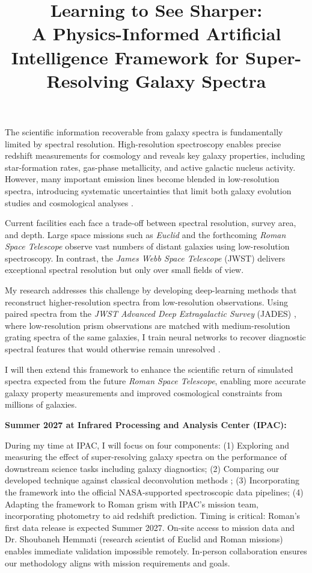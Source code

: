 \documentclass[12pt]{article}
\title{Learning to See Sharper:\\ A Physics-Informed Artificial Intelligence Framework for Super-Resolving Galaxy Spectra}
\date{}
\begin{document}
\maketitle
\vspace{-2.5cm}

The scientific information recoverable from galaxy spectra is fundamentally limited by spectral resolution. High-resolution spectroscopy enables precise redshift measurements for cosmology and reveals key galaxy properties, including star-formation rates, gas-phase metallicity, and active galactic nucleus activity. However, many important emission lines become blended in low-resolution spectra, introducing systematic uncertainties that limit both galaxy evolution studies and cosmological analyses \citep{Hemmati2019, DESI2025, Shivaei2020, Khostovan2024}.

Current facilities each face a trade-off between spectral resolution, survey area, and depth. Large space missions such as \textit{Euclid} \citep{euclid} and the forthcoming \textit{Roman Space Telescope} \citep{roman_1, roman_2} observe vast numbers of distant galaxies using low-resolution spectroscopy. In contrast, the \textit{James Webb Space Telescope} (JWST) \citep{jwst} delivers exceptional spectral resolution but only over small fields of view. 

My research addresses this challenge by developing deep-learning methods that reconstruct higher-resolution spectra from low-resolution observations. Using paired spectra from the \textit{JWST Advanced Deep Extragalactic Survey} (JADES) \citep{jades_overview}, where low-resolution prism observations are matched with medium-resolution grating spectra of the same galaxies, I train neural networks to recover diagnostic spectral features that would otherwise remain unresolved \citep{haghjoo2026}.

I will then extend this framework to enhance the scientific return of simulated spectra expected from the future \textit{Roman Space Telescope}, enabling more accurate galaxy property measurements and improved cosmological constraints from millions of galaxies.


\textbf{Summer 2027 at Infrared Processing and Analysis Center (IPAC):}

During my time at IPAC, I will focus on four components: (1) Exploring and measuring the effect of super-resolving galaxy spectra on the performance of downstream science tasks including galaxy diagnostics; (2) Comparing our developed technique against classical deconvolution methods \citep{lucy1974, richardson1972, scourfield2023}; (3) Incorporating the framework into the official NASA-supported spectroscopic data pipelines; (4) Adapting the framework to Roman grism with IPAC's mission team, incorporating photometry to aid redshift prediction. Timing is critical: Roman's first data release is expected Summer 2027. On-site access to mission data and Dr. Shoubaneh Hemmati (research scientist of Euclid and Roman missions) enables immediate validation impossible remotely. In-person collaboration ensures our methodology aligns with mission requirements and goals.
\end{document}
